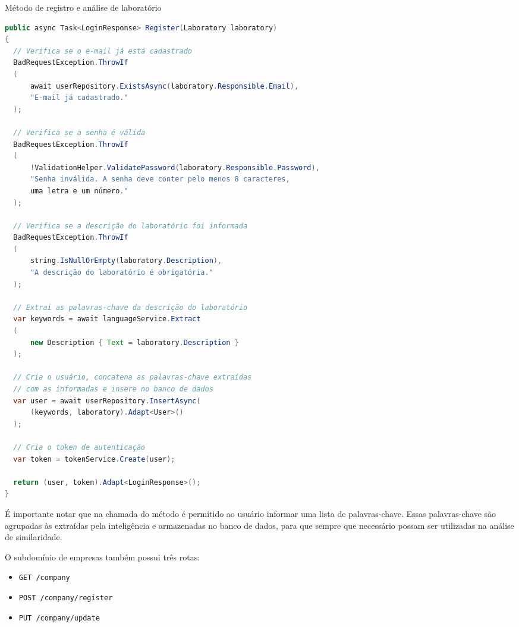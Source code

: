 \begin{sourcecode}[htb]
  \caption{\label{codigo:analyze-lab}Método de registro e análise de laboratório}
  \begin{lstlisting}[frame=single, language=Java]
public async Task<LoginResponse> Register(Laboratory laboratory)
{
  // Verifica se o e-mail já está cadastrado
  BadRequestException.ThrowIf 
  (
      await userRepository.ExistsAsync(laboratory.Responsible.Email), 
      "E-mail já cadastrado."
  );

  // Verifica se a senha é válida
  BadRequestException.ThrowIf
  (
      !ValidationHelper.ValidatePassword(laboratory.Responsible.Password), 
      "Senha inválida. A senha deve conter pelo menos 8 caracteres, 
      uma letra e um número."
  );

  // Verifica se a descrição do laboratório foi informada
  BadRequestException.ThrowIf
  (
      string.IsNullOrEmpty(laboratory.Description), 
      "A descrição do laboratório é obrigatória."
  );

  // Extrai as palavras-chave da descrição do laboratório
  var keywords = await languageService.Extract
  (
      new Description { Text = laboratory.Description }
  );

  // Cria o usuário, concatena as palavras-chave extraídas 
  // com as informadas e insere no banco de dados
  var user = await userRepository.InsertAsync(
      (keywords, laboratory).Adapt<User>()
  );

  // Cria o token de autenticação
  var token = tokenService.Create(user);

  return (user, token).Adapt<LoginResponse>();
}
\end{lstlisting}
  \fonte{}
\end{sourcecode}

É importante notar que na chamada do método é permitido ao usuário informar uma lista de palavras-chave. Essas palavras-chave são agrupadas às extraídas pela inteligência e armazenadas no banco de dados, para que sempre que necessário possam ser utilizadas na análise de similaridade.

O subdomínio de empresas também possui três rotas:

\begin{itemize}
  \item \texttt{GET /company}
  \item \texttt{POST /company/register}
  \item \texttt{PUT /company/update}
\end{itemize}

